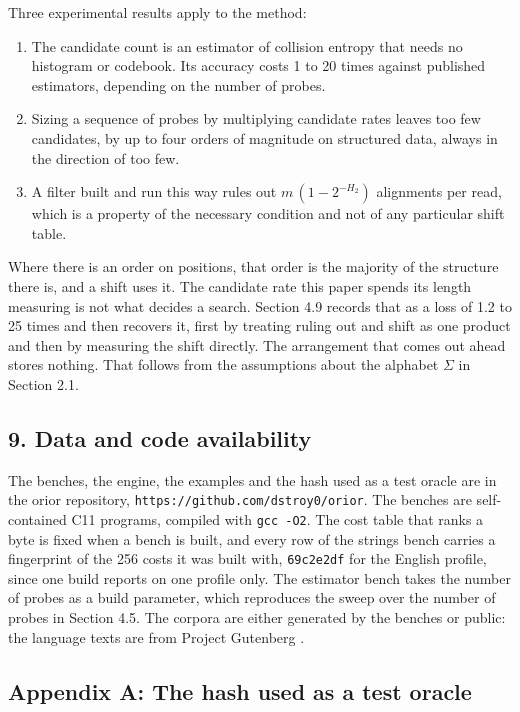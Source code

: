 Three experimental results apply to the method:

\begin{enumerate}
  \item The candidate count is an estimator of collision entropy that needs no histogram or
    codebook. Its accuracy costs 1 to 20 times against published estimators, depending on the
    number of probes.
  \item Sizing a sequence of probes by multiplying candidate rates leaves too few candidates, by up
    to four orders of magnitude on structured data, always in the direction of too few.
  \item A filter built and run this way rules out \(m\,(1 - 2^{-H_2})\) alignments per read, which
    is a property of the necessary condition and not of any particular shift table.
\end{enumerate}

Where there is an order on positions, that order is the majority of the structure there is, and a shift uses it. The candidate rate this paper spends its length measuring is not what decides a search. Section 4.9 records that as a loss of 1.2 to 25 times and then recovers it, first by treating ruling out and shift as one product and then by measuring the shift directly. The arrangement that comes out ahead stores nothing. That follows from the assumptions about the alphabet \(\Sigma\) in Section 2.1.

\subsection{9. Data and code availability}

The benches, the engine, the examples and the hash used as a test oracle are in the orior repository, \texttt{https://github.com/dstroy0/orior}. The benches are self-contained C11 programs, compiled with \texttt{gcc -O2}. The cost table that ranks a byte is fixed when a bench is built, and every row of the strings bench carries a fingerprint of the 256 costs it was built with, \texttt{69c2e2df} for the English profile, since one build reports on one profile only. The estimator bench takes the number of probes as a build parameter, which reproduces the sweep over the number of probes in Section 4.5. The corpora are either generated by the benches or public: the language texts are from Project Gutenberg \cite{src:Project-Gutenberg}.

\subsection{Appendix A: The hash used as a test oracle}

